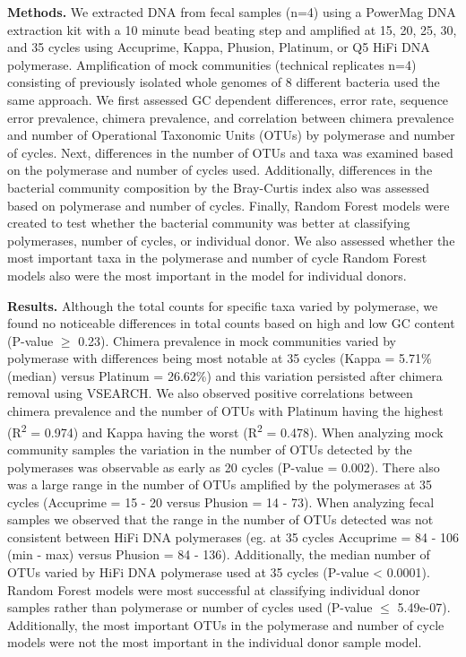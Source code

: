 \documentclass[11pt,]{article}
\begin{document}
\textbf{Methods.} We extracted DNA from fecal samples (n=4) using a
PowerMag DNA extraction kit with a 10 minute bead beating step and
amplified at 15, 20, 25, 30, and 35 cycles using Accuprime, Kappa,
Phusion, Platinum, or Q5 HiFi DNA polymerase. Amplification of mock
communities (technical replicates n=4) consisting of previously isolated
whole genomes of 8 different bacteria used the same approach. We first
assessed GC dependent differences, error rate, sequence error
prevalence, chimera prevalence, and correlation between chimera
prevalence and number of Operational Taxonomic Units (OTUs) by
polymerase and number of cycles. Next, differences in the number of OTUs
and taxa was examined based on the polymerase and number of cycles used.
Additionally, differences in the bacterial community composition by the
Bray-Curtis index also was assessed based on polymerase and number of
cycles. Finally, Random Forest models were created to test whether the
bacterial community was better at classifying polymerases, number of
cycles, or individual donor. We also assessed whether the most important
taxa in the polymerase and number of cycle Random Forest models also
were the most important in the model for individual donors.

\textbf{Results.} Although the total counts for specific taxa varied by
polymerase, we found no noticeable differences in total counts based on
high and low GC content (P-value \(\geqslant\) 0.23). Chimera prevalence
in mock communities varied by polymerase with differences being most
notable at 35 cycles (Kappa = 5.71\% (median) versus Platinum = 26.62\%)
and this variation persisted after chimera removal using VSEARCH. We
also observed positive correlations between chimera prevalence and the
number of OTUs with Platinum having the highest (R\textsuperscript{2} =
0.974) and Kappa having the worst (R\textsuperscript{2} = 0.478). When
analyzing mock community samples the variation in the number of OTUs
detected by the polymerases was observable as early as 20 cycles
(P-value = 0.002). There also was a large range in the number of OTUs
amplified by the polymerases at 35 cycles (Accuprime = 15 - 20 versus
Phusion = 14 - 73). When analyzing fecal samples we observed that the
range in the number of OTUs detected was not consistent between HiFi DNA
polymerases (eg. at 35 cycles Accuprime = 84 - 106 (min - max) versus
Phusion = 84 - 136). Additionally, the median number of OTUs varied by
HiFi DNA polymerase used at 35 cycles (P-value \textless{} 0.0001).
Random Forest models were most successful at classifying individual
donor samples rather than polymerase or number of cycles used (P-value
\(\leqslant\) 5.49e-07). Additionally, the most important OTUs in the
polymerase and number of cycle models were not the most important in the
individual donor sample model.
\end{document}
